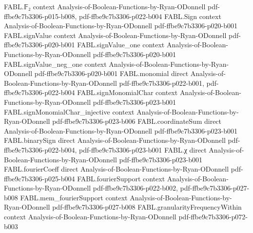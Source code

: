 \begin{theorem}
\label{FABL.tendsto_tribesCriticalCoordinateInfluence_mul_dimension_div_log}
\leanok
{}
\proofstep
  {FABL.𝔽₂}
  {context}
  {Analysis-of-Boolean-Functions-by-Ryan-ODonnell}
  {pdf-ffbe9c7b3306-p015-b008,
    pdf-ffbe9c7b3306-p022-b004}
\proofstep
  {FABL.Sign}
  {context}
  {Analysis-of-Boolean-Functions-by-Ryan-ODonnell}
  {pdf-ffbe9c7b3306-p020-b001}
\proofstep
  {FABL.signValue}
  {context}
  {Analysis-of-Boolean-Functions-by-Ryan-ODonnell}
  {pdf-ffbe9c7b3306-p020-b001}
\proofstep
  {FABL.signValue_one}
  {context}
  {Analysis-of-Boolean-Functions-by-Ryan-ODonnell}
  {pdf-ffbe9c7b3306-p020-b001}
\proofstep
  {FABL.signValue_neg_one}
  {context}
  {Analysis-of-Boolean-Functions-by-Ryan-ODonnell}
  {pdf-ffbe9c7b3306-p020-b001}
\proofstep
  {FABL.monomial}
  {direct}
  {Analysis-of-Boolean-Functions-by-Ryan-ODonnell}
  {pdf-ffbe9c7b3306-p022-b001,
    pdf-ffbe9c7b3306-p022-b004}
\proofstep
  {FABL.signMonomialChar}
  {context}
  {Analysis-of-Boolean-Functions-by-Ryan-ODonnell}
  {pdf-ffbe9c7b3306-p023-b001}
\proofstep
  {FABL.signMonomialChar_injective}
  {context}
  {Analysis-of-Boolean-Functions-by-Ryan-ODonnell}
  {pdf-ffbe9c7b3306-p023-b006}
\proofstep
  {FABL.coordinateSum}
  {direct}
  {Analysis-of-Boolean-Functions-by-Ryan-ODonnell}
  {pdf-ffbe9c7b3306-p023-b001}
\proofstep
  {FABL.binarySign}
  {direct}
  {Analysis-of-Boolean-Functions-by-Ryan-ODonnell}
  {pdf-ffbe9c7b3306-p022-b004,
    pdf-ffbe9c7b3306-p023-b001}
\proofstep
  {FABL.χ}
  {direct}
  {Analysis-of-Boolean-Functions-by-Ryan-ODonnell}
  {pdf-ffbe9c7b3306-p023-b001}
\proofstep
  {FABL.fourierCoeff}
  {direct}
  {Analysis-of-Boolean-Functions-by-Ryan-ODonnell}
  {pdf-ffbe9c7b3306-p025-b004}
\proofstep
  {FABL.fourierSupport}
  {context}
  {Analysis-of-Boolean-Functions-by-Ryan-ODonnell}
  {pdf-ffbe9c7b3306-p022-b002,
    pdf-ffbe9c7b3306-p027-b008}
\proofstep
  {FABL.mem_fourierSupport}
  {context}
  {Analysis-of-Boolean-Functions-by-Ryan-ODonnell}
  {pdf-ffbe9c7b3306-p027-b008}
\proofstep
  {FABL.granularityFrequencyWithin}
  {context}
  {Analysis-of-Boolean-Functions-by-Ryan-ODonnell}
  {pdf-ffbe9c7b3306-p072-b003}

\end{theorem}
